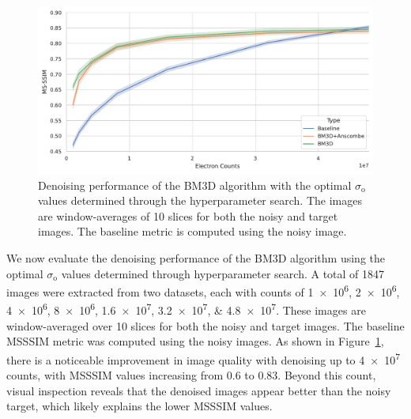 \begin{figure}[h]
    \centering
    \includegraphics[width=0.7\linewidth]{images/bm3d_msssim.pdf}
    \caption{Denoising performance of the \gls{BM3D} algorithm with the optimal $\sigma_{\text{o}}$ values determined through the hyperparameter search. The images are window-averages of 10 slices for both the noisy and target images. The baseline metric is computed using the noisy image.}
    \label{fig:bm3d-msssim}
\end{figure}

We now evaluate the denoising performance of the \gls{BM3D} algorithm using the optimal $\sigma_{\text{o}}$ values determined through hyperparameter search. A total of \num{1847} images were extracted from two datasets, each with counts of \numlist{1e6;2e6;4e6;8e6;1.6e7;3.2e7;4.8e7}. These images are window-averaged over 10 slices for both the noisy and target images. The baseline \gls{MSSSIM} metric was computed using the noisy images. As shown in Figure~\ref{fig:bm3d-msssim}, there is a noticeable improvement in image quality with denoising up to \num{4e7} counts, with \gls{MSSSIM} values increasing from \num{0.6} to \num{0.83}. Beyond this count, visual inspection reveals that the denoised images appear better than the noisy target, which likely explains the lower \gls{MSSSIM} values.
